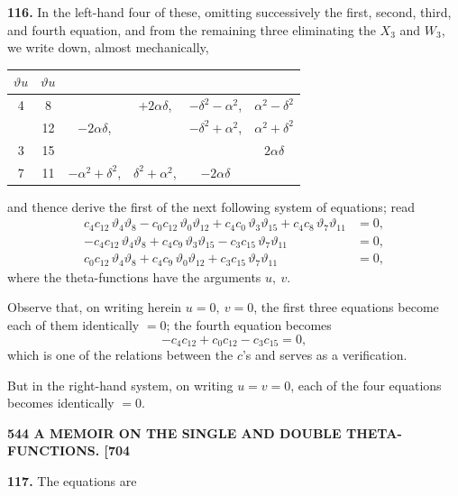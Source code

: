 \documentclass[11pt]{article}
\begin{document}
\medskip
\textbf{116.} In the left-hand four of these, omitting successively the first, second, third, and fourth equation, and from the remaining three eliminating the $X_3$ and $W_3$, we write down, almost mechanically,

\smallskip
\begin{center}
\begin{tabular}{cc|cccc}
$\vartheta u$ & $\vartheta u$ & & & & \\\hline
4 & 8 & & $+2\alpha\delta$, & $-\delta^2 - \alpha^2$, & $\alpha^2 - \delta^2$\\
  & 12 & $-2\alpha\delta$, & & $-\delta^2 + \alpha^2$, & $\alpha^2 + \delta^2$\\
3 & 15 & & & & $2\alpha\delta$\\
7 & 11 & $-\alpha^2 + \delta^2$, & $\delta^2 + \alpha^2$, & $-2\alpha\delta$ & \\
\end{tabular}
\end{center}

and thence derive the first of the next following system of equations; read
\[
\begin{aligned}
c_4 c_{12}\,\vartheta_4\vartheta_8 - c_0 c_{12}\,\vartheta_0\vartheta_{12} + c_4 c_0\,\vartheta_3\vartheta_{15} + c_4 c_8\,\vartheta_7\vartheta_{11} &= 0,\\
-c_4 c_{12}\,\vartheta_4\vartheta_8 + c_4 c_9\,\vartheta_3\vartheta_{15} - c_3 c_{15}\,\vartheta_7\vartheta_{11} &= 0,\\
c_0 c_{12}\,\vartheta_4\vartheta_8 + c_4 c_9\,\vartheta_0\vartheta_{12} + c_3 c_{15}\,\vartheta_7\vartheta_{11} &= 0,
\end{aligned}
\]
where the theta-functions have the arguments $u,\ v$.

\medskip
Observe that, on writing herein $u = 0,\ v = 0$, the first three equations become each of them identically $=0$; the fourth equation becomes
\[
-c_4 c_{12} + c_0 c_{12} - c_3 c_{15} = 0,
\]
which is one of the relations between the $c$'s and serves as a verification.

\medskip
But in the right-hand system, on writing $u = v = 0$, each of the four equations becomes identically $=0$.

\newpage
\noindent\textbf{544 \hfill A MEMOIR ON THE SINGLE AND DOUBLE THETA-FUNCTIONS. \hfill [704}

\medskip
\textbf{117.} The equations are
\end{document}
